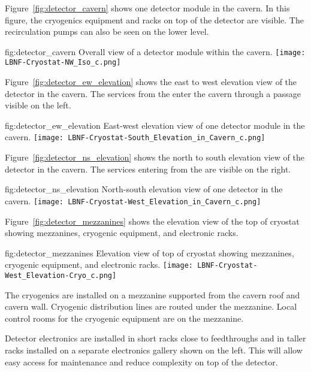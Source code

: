 Figure~\ref{fig:detector_cavern} shows one detector module in the
cavern. In this figure, the cryogenics equipment and racks on top of
the detector are visible. The  recirculation pumps can also be seen
on the lower level.
\begin{dunefigure}{fig:detector_cavern}
  {Overall view of a detector module within the cavern.}
  \texttt{[image: LBNF-Cryostat-NW\_Iso\_c.png]}
\end{dunefigure}

Figure~\ref{fig:detector_ew_elevation} shows the east to west elevation view of the
detector in the cavern. The services from the
 enter the cavern through a passage visible on the left.
\begin{dunefigure}{fig:detector_ew_elevation}
  {East-west elevation view of one detector module in the cavern.}
  \texttt{[image: LBNF-Cryostat-South\_Elevation\_in\_Cavern\_c.png]}
\end{dunefigure}

Figure~\ref{fig:detector_ns_elevation} shows the north to south elevation view of the
detector in the cavern. The services entering
from the  are visible on the right.
\begin{dunefigure}{fig:detector_ns_elevation}
  {North-south elevation view of one detector in the cavern.}
  \texttt{[image: LBNF-Cryostat-West\_Elevation\_in\_Cavern\_c.png]}
\end{dunefigure}

Figure~\ref{fig:detector_mezzanines} shows the elevation view of the
top of cryostat showing mezzanines, cryogenic equipment, and electronic
racks.
\begin{dunefigure}{fig:detector_mezzanines}
  {Elevation view of top of cryostat showing mezzanines, cryogenic
    equipment, and electronic racks.}
  \texttt{[image: LBNF-Cryostat-West\_Elevation-Cryo\_c.png]}
\end{dunefigure}
The cryogenics are installed on a mezzanine supported from
the cavern roof and cavern wall. Cryogenic distribution lines are
routed under the mezzanine. Local control rooms for the
cryogenic equipment are on the mezzanine.

Detector electronics are installed in short racks close to
feedthroughs and in taller racks installed on a separate
electronics gallery shown on the left. This will allow easy access
for maintenance and reduce complexity on top of the detector.
